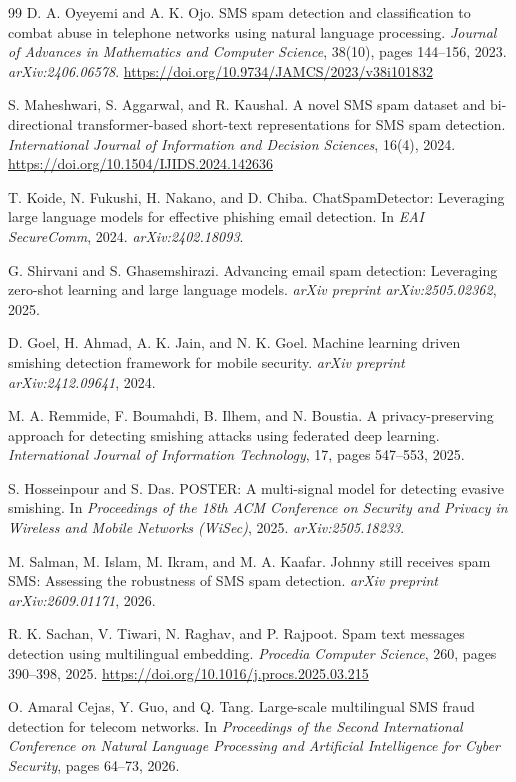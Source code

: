 \documentclass[11pt]{article}
\begin{document}
\begin{thebibliography}{99}
D. A. Oyeyemi and A. K. Ojo.
SMS spam detection and classification to combat abuse in telephone networks using natural language processing.
\textit{Journal of Advances in Mathematics and Computer Science}, 38(10), pages 144--156, 2023.
\textit{arXiv:2406.06578}. \url{https://doi.org/10.9734/JAMCS/2023/v38i101832}

S. Maheshwari, S. Aggarwal, and R. Kaushal.
A novel SMS spam dataset and bi-directional transformer-based short-text representations for SMS spam detection.
\textit{International Journal of Information and Decision Sciences}, 16(4), 2024.
\url{https://doi.org/10.1504/IJIDS.2024.142636}

T. Koide, N. Fukushi, H. Nakano, and D. Chiba.
ChatSpamDetector: Leveraging large language models for effective phishing email detection.
In \textit{EAI SecureComm}, 2024. \textit{arXiv:2402.18093}.

G. Shirvani and S. Ghasemshirazi.
Advancing email spam detection: Leveraging zero-shot learning and large language models.
\textit{arXiv preprint arXiv:2505.02362}, 2025.

D. Goel, H. Ahmad, A. K. Jain, and N. K. Goel.
Machine learning driven smishing detection framework for mobile security.
\textit{arXiv preprint arXiv:2412.09641}, 2024.

M. A. Remmide, F. Boumahdi, B. Ilhem, and N. Boustia.
A privacy-preserving approach for detecting smishing attacks using federated deep learning.
\textit{International Journal of Information Technology}, 17, pages 547--553, 2025.

S. Hosseinpour and S. Das.
POSTER: A multi-signal model for detecting evasive smishing.
In \textit{Proceedings of the 18th ACM Conference on Security and Privacy in Wireless and Mobile Networks (WiSec)}, 2025.
\textit{arXiv:2505.18233}.

M. Salman, M. Islam, M. Ikram, and M. A. Kaafar.
Johnny still receives spam SMS: Assessing the robustness of SMS spam detection.
\textit{arXiv preprint arXiv:2609.01171}, 2026.

R. K. Sachan, V. Tiwari, N. Raghav, and P. Rajpoot.
Spam text messages detection using multilingual embedding.
\textit{Procedia Computer Science}, 260, pages 390--398, 2025.
\url{https://doi.org/10.1016/j.procs.2025.03.215}

O. Amaral Cejas, Y. Guo, and Q. Tang.
Large-scale multilingual SMS fraud detection for telecom networks.
In \textit{Proceedings of the Second International Conference on Natural Language Processing and Artificial Intelligence for Cyber Security}, pages 64--73, 2026.


\end{thebibliography}
\end{document}
